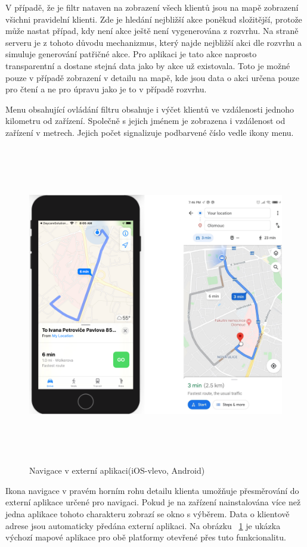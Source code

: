 \documentclass[
  biblatex,
  glossaries,
  index
]{kidiplom}
\begin{document}
V případě, že je filtr nataven na zobrazení všech klientů jsou na mapě zobrazení všichni pravidelní klienti. Zde je hledání nejbližší akce poněkud složitější, protože může nastat případ, kdy není akce ještě není vygenerována z rozvrhu. Na straně serveru je z tohoto důvodu mechanizmus, který najde nejbližší akci dle rozvrhu a simuluje generování patřičné akce. Pro aplikaci je tato akce naprosto transparentní a dostane stejná data jako by akce už existovala. Toto je možné pouze v případě zobrazení v detailu na mapě, kde jsou data o akci určena pouze pro čtení a ne pro úpravu jako je to v případě rozvrhu.

Menu obsahující ovládání filtru obsahuje i výčet klientů ve vzdálenosti jednoho kilometru od zařízení. Společně s jejich jménem je zobrazena i vzdálenost od zařízení v metrech. Jejich počet signalizuje podbarvené číslo vedle ikony menu.

\begin{figure}[H]
  	\centering
 	 \includegraphics[width=14cm,height=14cm,keepaspectratio]{external_navig}
 	 \caption{Navigace v externí aplikaci(iOS-vlevo, Android)}
 	 \label{fig:externalNavig}
\end{figure}

Ikona navigace v pravém horním rohu detailu klienta umožňuje přesměrování do externí aplikace určené pro navigaci. Pokud je na zařízení nainstalována více než jedna aplikace tohoto charakteru zobrazí se okno s výběrem. Data o klientově adrese jsou automaticky předána externí aplikaci. Na obrázku ~\ref{fig:externalNavig} je ukázka výchozí mapové aplikace pro obě platformy otevřené přes tuto funkcionalitu.
\end{document}
